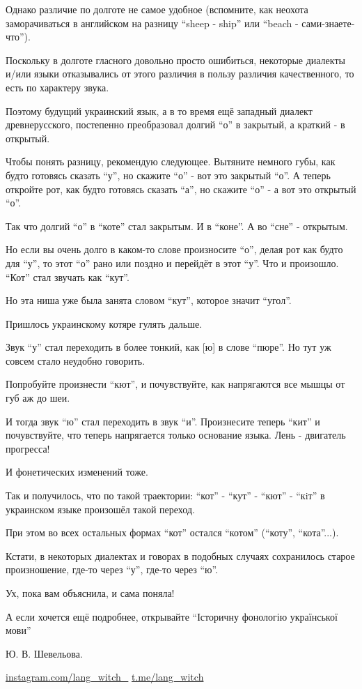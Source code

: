 Однако различие по долготе не самое удобное (вспомните, как неохота
заморачиваться в английском на разницу \enquote{sheep - ship} или \enquote{beach -
сами-знаете-что}).

Поскольку в долготе гласного довольно просто ошибиться, некоторые диалекты
и/или языки отказывались от этого различия в пользу различия качественного, то
есть по характеру звука.

Поэтому будущий украинский язык, а в то время ещё западный диалект
древнерусского, постепенно преобразовал долгий \enquote{о} в закрытый, а
краткий - в открытый.

Чтобы понять разницу, рекомендую следующее. Вытяните немного губы, как будто
готовясь сказать \enquote{у}, но скажите \enquote{о} - вот это закрытый
\enquote{о}. А теперь откройте рот, как будто готовясь сказать \enquote{а}, но
скажите \enquote{о} - а вот это открытый \enquote{о}. 

Так что долгий \enquote{о} в \enquote{коте} стал закрытым. И в \enquote{коне}.
А во \enquote{сне} - открытым.

Но если вы очень долго в каком-то слове произносите \enquote{о}, делая рот как
будто для \enquote{у}, то этот \enquote{о} рано или поздно и перейдёт в этот
\enquote{у}. Что и произошло.  \enquote{Кот} стал звучать как \enquote{кут}.

Но эта ниша уже была занята словом \enquote{кут}, которое значит
\enquote{угол}.

Пришлось украинскому котяре гулять дальше.

Звук \enquote{у} стал переходить в более тонкий, как [ю] в слове \enquote{пюре}. Но тут уж
совсем стало неудобно говорить.

Попробуйте произнести \enquote{кют}, и почувствуйте, как напрягаются все мышцы от губ
аж до шеи.

И тогда звук \enquote{ю} стал переходить в звук \enquote{и}. Произнесите теперь \enquote{кит} и
почувствуйте, что теперь напрягается только основание языка. Лень - двигатель
прогресса!

И фонетических изменений тоже.

Так и получилось, что по такой траектории: \enquote{кот} - \enquote{кут} - \enquote{кют} - \enquote{кiт} в
украинском языке произошёл такой переход.

При этом во всех остальных формах \enquote{кот} остался \enquote{котом} (\enquote{коту}, \enquote{кота}...).

Кстати, в некоторых диалектах и говорах в подобных случаях сохранилось старое
произношение, где-то через \enquote{у}, где-то через \enquote{ю}.

Ух, пока вам объяснила, и сама поняла!

А если хочется ещё подробнее, открывайте \enquote{Історичну фонологію
української мови}

Ю. В. Шевельова.

\url{instagram.com/lang_witch_}
\url{t.me/lang_witch}
